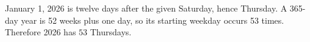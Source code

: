 January 1, 2026 is twelve days after the given Saturday, hence Thursday. A 365-day year is 52 weeks plus one day, so its starting weekday occurs 53 times. Therefore 2026 has $\boxed{53}$ Thursdays.
